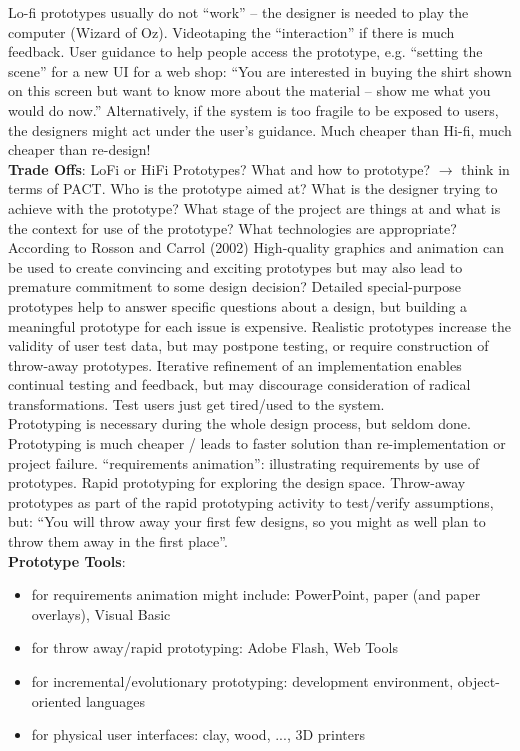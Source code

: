 Lo-fi prototypes usually do not ``work'' -- the designer is needed to play the computer (Wizard of Oz). Videotaping the ``interaction'' if there is much feedback. User guidance to help people access the prototype, e.g. ``setting the scene'' for a new UI for a web shop: ``You are interested in buying the shirt shown on this screen but want to know more about the material – show me what you would do now.'' Alternatively, if the system is too fragile to be exposed to users, the designers might act under the user's guidance. Much cheaper than Hi-fi, much cheaper than re-design!\\
\textbf{Trade Offs}: LoFi or HiFi Prototypes? What and how to prototype? $\rightarrow$ think in terms of PACT. Who is the prototype aimed at? What is the designer trying to achieve with the prototype? What stage of the project are things at and what is the context for use of the prototype? What technologies are appropriate?\\
According to Rosson and Carrol (2002) High-quality graphics and animation can be used to create convincing and exciting prototypes but may also lead to premature commitment to some design decision? Detailed special-purpose prototypes help to answer specific questions about a design, but building a meaningful prototype for each issue is expensive. Realistic prototypes increase the validity of user test data, but may postpone testing, or require construction of throw-away prototypes. Iterative refinement of an implementation enables continual testing and feedback, but may discourage consideration of radical transformations. Test users just get tired/used to the system.\\
Prototyping is necessary during the whole design process, but seldom done. Prototyping is much cheaper / leads to faster solution than re-implementation or project failure. ``requirements animation'': illustrating requirements by use of prototypes. Rapid prototyping for exploring the design space. Throw-away prototypes as part of the rapid prototyping activity to test/verify assumptions, but: ``You will throw away your first few designs, so you might as well plan to throw them away in the first place''.\\
\textbf{Prototype Tools}: 
\begin{itemize}
\item for requirements animation might include: PowerPoint, paper (and paper overlays), Visual Basic
\item for throw away/rapid prototyping: Adobe Flash, Web Tools
\item for incremental/evolutionary prototyping: development environment, object-oriented languages
\item for physical user interfaces: clay, wood, ..., 3D printers
\end{itemize}